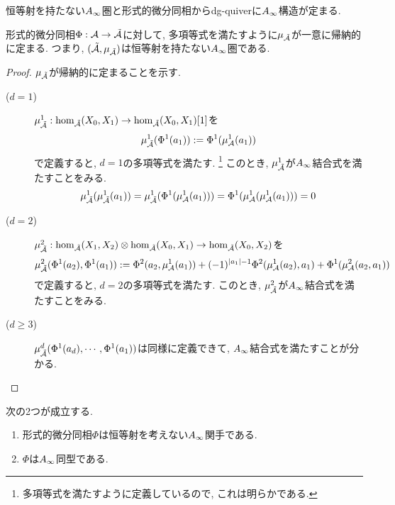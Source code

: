 \documentclass[uplatex, a4paper, 14Q, dvipdfmx]{jsarticle}
\begin{document}
恒等射を持たない$A_{\infty}$圏と形式的微分同相からdg-quiverに$A_{\infty}$構造が定まる. 

\begin{theorem} \label{prop_modified_Ainf_structure}
  形式的微分同相$\Phi : \mathcal{A} \to \tilde{\mathcal{A}}$に対して, 多項等式を満たすように$\mu_{\tilde{\mathcal{A}}}$が一意に帰納的に定まる.
  つまり, $(\tilde{\mathcal{A}}, \mu_{\tilde{\mathcal{A}}})$は恒等射を持たない$A_{\infty}$圏である. 
\end{theorem}

\begin{proof}
  $\mu_{\tilde{\mathcal{A}}}$が帰納的に定まることを示す. 
  \begin{description}
    \item[($d=1$)] $\mu^1_{\tilde{\mathcal{A}}} : \hom_{\tilde{\mathcal{A}}}(X_0,X_1) \to \hom_{\tilde{\mathcal{A}}}(X_0,X_1)[1]$を
    \begin{align*}
      \mu^1_{\tilde{\mathcal{A}}} (\Phi^1(a_1))
      := \Phi^1(\mu^1_{\mathcal{A}}(a_1))
    \end{align*}
    で定義すると, $d=1$の多項等式を満たす.
    \footnote{
      多項等式を満たすように定義しているので, これは明らかである. 
    }
    このとき, $\mu^1_{\tilde{\mathcal{A}}}$が$A_{\infty}$結合式を満たすことをみる. 
    \begin{align*}
      \mu^1_{\tilde{\mathcal{A}}} (\mu^1_{\tilde{\mathcal{A}}} (a_1))
      = \mu^1_{\tilde{\mathcal{A}}} (\Phi^1(\mu^1_{\mathcal{A}}(a_1))) 
      = \Phi^1(\mu^1_{\mathcal{A}} (\mu^1_{\mathcal{A}} (a_1))) 
      = 0
    \end{align*}
    \item[($d=2$)] $\mu^2_{\tilde{\mathcal{A}}} : \hom_{\tilde{\mathcal{A}}}(X_1,X_2) \otimes \hom_{\tilde{\mathcal{A}}}(X_0,X_1) \to \hom_{\tilde{\mathcal{A}}}(X_0,X_2)$を
    \begin{align*}
      \mu^2_{\tilde{\mathcal{A}}} (\Phi^1(a_2),\Phi^1(a_1)) 
      := \Phi^2(a_2,\mu^1_{\mathcal{A}}(a_1)) + (-1)^{|a_1|-1} \Phi^2(\mu^1_{\mathcal{A}}(a_2),a_1) + \Phi^1(\mu^2_{\mathcal{A}}(a_2,a_1))
    \end{align*}
    で定義すると, $d=2$の多項等式を満たす.
    このとき, $\mu^2_{\tilde{\mathcal{A}}}$が$A_{\infty}$結合式を満たすことをみる. 
    \item[($d \geq 3$)] $\mu^d_{\tilde{\mathcal{A}}} (\Phi^1(a_d), \cdots, \Phi^1(a_1))$は同様に定義できて, $A_{\infty}$結合式を満たすことが分かる.
  \end{description}
\end{proof}

\begin{corollary} \label{prop_Phi_is_Ainf_functor}
  次の2つが成立する. 
  \begin{enumerate}
    \item 形式的微分同相$\Phi$は恒等射を考えない$A_{\infty}$関手である. 
    \item $\Phi$は$A_{\infty}$同型である. 
  \end{enumerate}
\end{corollary}
\end{document}
